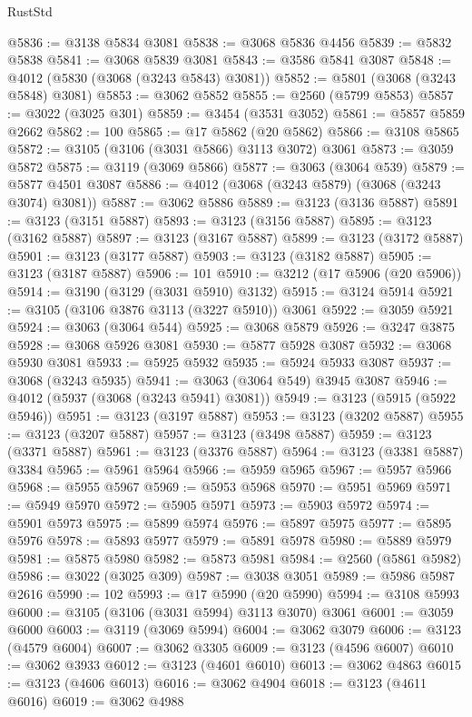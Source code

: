 \begin{lexlean}{RustStd}
\begin{coremodule}
@5836 := @3138 @5834 @3081
@5838 := @3068 @5836 @4456
@5839 := @5832 @5838
@5841 := @3068 @5839 @3081
@5843 := @3586 @5841 @3087
@5848 := @4012 (@5830 (@3068 (@3243 @5843) @3081))
@5852 := @5801 (@3068 (@3243 @5848) @3081)
@5853 := @3062 @5852
@5855 := @2560 (@5799 @5853)
@5857 := @3022 (@3025 @301)
@5859 := @3454 (@3531 @3052)
@5861 := @5857 @5859 @2662
@5862 := 100
@5865 := @17 @5862 (@20 @5862)
@5866 := @3108 @5865
@5872 := @3105 (@3106 (@3031 @5866) @3113 @3072) @3061
@5873 := @3059 @5872
@5875 := @3119 (@3069 @5866)
@5877 := @3063 (@3064 @539)
@5879 := @5877 @4501 @3087
@5886 := @4012 (@3068 (@3243 @5879) (@3068 (@3243 @3074) @3081))
@5887 := @3062 @5886
@5889 := @3123 (@3136 @5887)
@5891 := @3123 (@3151 @5887)
@5893 := @3123 (@3156 @5887)
@5895 := @3123 (@3162 @5887)
@5897 := @3123 (@3167 @5887)
@5899 := @3123 (@3172 @5887)
@5901 := @3123 (@3177 @5887)
@5903 := @3123 (@3182 @5887)
@5905 := @3123 (@3187 @5887)
@5906 := 101
@5910 := @3212 (@17 @5906 (@20 @5906))
@5914 := @3190 (@3129 (@3031 @5910) @3132)
@5915 := @3124 @5914
@5921 := @3105 (@3106 @3876 @3113 (@3227 @5910)) @3061
@5922 := @3059 @5921
@5924 := @3063 (@3064 @544)
@5925 := @3068 @5879
@5926 := @3247 @3875
@5928 := @3068 @5926 @3081
@5930 := @5877 @5928 @3087
@5932 := @3068 @5930 @3081
@5933 := @5925 @5932
@5935 := @5924 @5933 @3087
@5937 := @3068 (@3243 @5935)
@5941 := @3063 (@3064 @549) @3945 @3087
@5946 := @4012 (@5937 (@3068 (@3243 @5941) @3081))
@5949 := @3123 (@5915 (@5922 @5946))
@5951 := @3123 (@3197 @5887)
@5953 := @3123 (@3202 @5887)
@5955 := @3123 (@3207 @5887)
@5957 := @3123 (@3498 @5887)
@5959 := @3123 (@3371 @5887)
@5961 := @3123 (@3376 @5887)
@5964 := @3123 (@3381 @5887) @3384
@5965 := @5961 @5964
@5966 := @5959 @5965
@5967 := @5957 @5966
@5968 := @5955 @5967
@5969 := @5953 @5968
@5970 := @5951 @5969
@5971 := @5949 @5970
@5972 := @5905 @5971
@5973 := @5903 @5972
@5974 := @5901 @5973
@5975 := @5899 @5974
@5976 := @5897 @5975
@5977 := @5895 @5976
@5978 := @5893 @5977
@5979 := @5891 @5978
@5980 := @5889 @5979
@5981 := @5875 @5980
@5982 := @5873 @5981
@5984 := @2560 (@5861 @5982)
@5986 := @3022 (@3025 @309)
@5987 := @3038 @3051
@5989 := @5986 @5987 @2616
@5990 := 102
@5993 := @17 @5990 (@20 @5990)
@5994 := @3108 @5993
@6000 := @3105 (@3106 (@3031 @5994) @3113 @3070) @3061
@6001 := @3059 @6000
@6003 := @3119 (@3069 @5994)
@6004 := @3062 @3079
@6006 := @3123 (@4579 @6004)
@6007 := @3062 @3305
@6009 := @3123 (@4596 @6007)
@6010 := @3062 @3933
@6012 := @3123 (@4601 @6010)
@6013 := @3062 @4863
@6015 := @3123 (@4606 @6013)
@6016 := @3062 @4904
@6018 := @3123 (@4611 @6016)
@6019 := @3062 @4988

\end{coremodule}
\end{lexlean}
